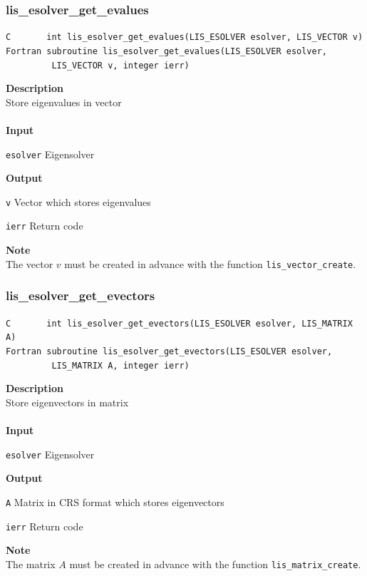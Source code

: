 \documentclass[a4paper]{article}
\newcommand{\namelistlabel}[1]{\mbox{#1}\hfill}
\newenvironment{namelist}[1]{%
 \begin{list}{}
  {\let\makelabel\namelistlabel
  \settowidth{\labelwidth}{#1}
  \setlength{\leftmargin}{1.1\labelwidth}}
}{%
\end{list}}
\begin{document}
  \subsubsection{lis\_esolver\_get\_evalues}
\begin{screen}
\verb|C       int lis_esolver_get_evalues(LIS_ESOLVER esolver, LIS_VECTOR v)|\\
\verb|Fortran subroutine lis_esolver_get_evalues(LIS_ESOLVER esolver,|\\
\verb|         LIS_VECTOR v, integer ierr)|
\end{screen}
{\bf Description}\\
\indent
Store eigenvalues in vector
\\ \\
\noindent
{\bf Input}
\begin{namelist}{XXXXXXXXXXXXXXXXXXXX}
\item[\tt esolver] Eigensolver
\end{namelist}
{\bf Output}
\begin{namelist}{XXXXXXXXXXXXXXXXXXXX}
\item[\tt v]  Vector which stores eigenvalues
\item[\tt ierr] Return code
\end{namelist}
{\bf Note}\\
\indent
The vector $v$ must be created in advance with the function \verb|lis_vector_create|. 
  \subsubsection{lis\_esolver\_get\_evectors}
\begin{screen}
\verb|C       int lis_esolver_get_evectors(LIS_ESOLVER esolver, LIS_MATRIX A)|\\
\verb|Fortran subroutine lis_esolver_get_evectors(LIS_ESOLVER esolver,|\\
\verb|         LIS_MATRIX A, integer ierr)|
\end{screen}
{\bf Description}\\
\indent
Store eigenvectors in matrix
\\ \\
\noindent
{\bf Input}
\begin{namelist}{XXXXXXXXXXXXXXXXXXXX}
\item[\tt esolver] Eigensolver
\end{namelist}
{\bf Output}
\begin{namelist}{XXXXXXXXXXXXXXXXXXXX}
\item[\tt A]  Matrix in CRS format which stores eigenvectors
\item[\tt ierr] Return code
\end{namelist}
{\bf Note}\\
\indent
The matrix $A$ must be created in advance with the function \verb|lis_matrix_create|. 
\newpage
\end{document}
